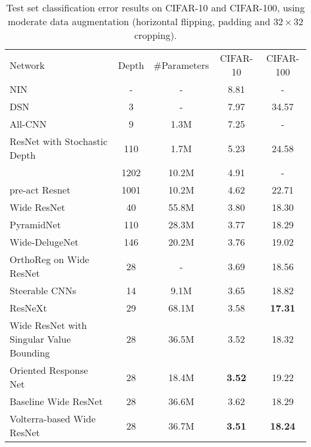 \documentclass[10pt,twocolumn,letterpaper]{article}
\renewcommand\arraystretch{1.2}
\begin{document}
\begin{table*}[!t]
\footnotesize
\centering
\setlength{\tabcolsep}{1.0em}
\renewcommand\arraystretch{1.35}
\begin{tabular}{|l|cc|cc|}

\hline
Network & Depth & \#Parameters & CIFAR-10 & CIFAR-100 \\
\Xhline{3\arrayrulewidth}
NIN~\cite{Nin14}                        & -    & -     & 8.81  & -     \\ \hline
DSN~\cite{DSN15}                        & 3    & -     & 7.97  & 34.57 \\ \hline
All-CNN~\cite{Striving15}               & 9    & 1.3M  & 7.25  & -     \\ \hline
ResNet with Stochastic Depth~\cite{ResNetStoch16} & 110 & 1.7M & 5.23 & 24.58 \\
                                        & 1202 & 10.2M & 4.91  & -     \\ \hline
pre-act Resnet~\cite{He16}              & 1001 & 10.2M & 4.62  & 22.71 \\ \hline
Wide ResNet~\cite{WRN16}                & 40   & 55.8M & 3.80  & 18.30 \\ \hline
PyramidNet~\cite{PyramidNet16}          & 110  & 28.3M & 3.77  & 18.29 \\ \hline
Wide-DelugeNet~\cite{DelugeNet16}       & 146  & 20.2M & 3.76  & 19.02 \\ \hline
OrthoReg on Wide ResNet~\cite{OrthoReg16} & 28   & -     & 3.69  & 18.56 \\ \hline
Steerable CNNs~\cite{Steerable16}       & 14   & 9.1M  & 3.65  & 18.82 \\ \hline
ResNeXt~\cite{ResNeXt16}                & 29   & 68.1M & 3.58  & \textbf{17.31} \\ \hline
Wide ResNet with Singular Value Bounding ~\cite{SVB16} & 28  & 36.5M & 3.52  & 18.32 \\ \hline
Oriented Response Net~\cite{ORN17}      & 28   & 18.4M & \textbf{3.52}  & 19.22 \\ \hline
\Xhline{3\arrayrulewidth}
Baseline Wide ResNet                    & 28   & 36.6M & 3.62 & 18.29 \\ \hline
Volterra-based Wide ResNet              & 28   & 36.7M & \textbf{3.51} & \textbf{18.24} \\
\hline

\end{tabular}
\caption{Test set classification error results on CIFAR-10 and CIFAR-100, using moderate data augmentation (horizontal flipping, padding and $32\times32$ cropping).}
\label{tab:CIFARs}
\end{table*}
\end{document}
